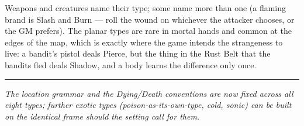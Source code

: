 Weapons and creatures name their type; some name more than one (a flaming brand is Slash and Burn --- roll the wound on whichever the attacker chooses, or the GM prefers). The planar types are rare in mortal hands and common at the edges of the map, which is exactly where the game intends the strangeness to live: a bandit's pistol deals Pierce, but the thing in the Rust Belt that the bandits fled deals Shadow, and a body learns the difference only once.

\medskip\hrule\medskip

\textit{The location grammar and the Dying/Death conventions are now fixed across all eight types; further exotic types (poison-as-its-own-type, cold, sonic) can be built on the identical frame should the setting call for them.}
